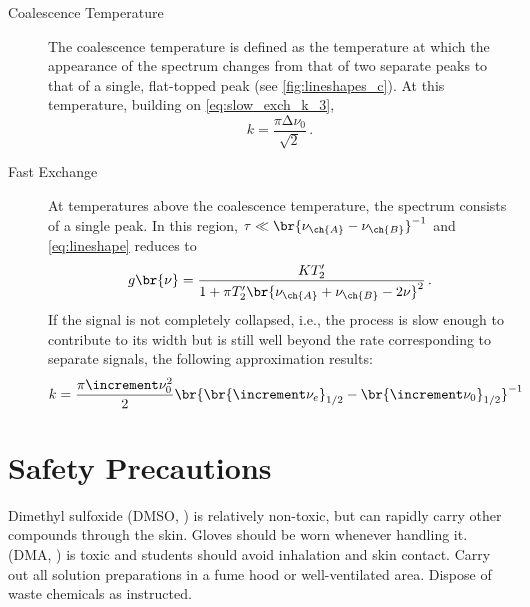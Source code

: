 \begin{description}
	\item[Coalescence Temperature]

	The coalescence temperature is defined as the temperature at which the appearance of the spectrum changes from that of two separate peaks to that of a single, flat-topped peak (see \cref{fig:lineshapes_c}). 
At this temperature, building on \cref{eq:slow_exch_k_3}, 
	\begin{equation}
  	k = \frac{\pi \increment \nu_0}{\sqrt{2}} \, .
  	\label{eq:intermed_exch_k}
	\end{equation}

	\item[Fast Exchange]

	At temperatures above the coalescence temperature, the spectrum consists of a single peak. 
	In this region, \( \tau \ll \br{\nu_{\ch{A}} - \nu_{\ch{B}}}^{-1} \) and \cref{eq:lineshape} reduces to
	\begin{equation}
		g\br{\nu} = \frac{K T'_2}{1 + \pi T'_2 \br{\nu_{\ch{A}} + \nu_{\ch{B}} - 2 \nu}^2} \, .
		\label{eq:fast_exch_lineshape}
	\end{equation}
	If the signal is not completely collapsed, i.e., the process is slow enough to contribute to its width but is still well beyond the rate corresponding to separate signals, the following approximation results:
	\begin{equation}
		k = \frac{\pi \increment \nu_0^2}{2} \br{\br{\increment \nu_e}_{1/2} - \br{\increment \nu_0}_{1/2}}^{-1}
		\label{eq:fast_exch_k}
	\end{equation}

\end{description}


\pagebreak

\section{Safety Precautions} %
\label{sec:safety}

Dimethyl sulfoxide (DMSO, ) is relatively non-toxic, but can rapidly carry other compounds through the skin. 
Gloves should be worn whenever handling it. 
 (DMA, ) is toxic and students should avoid inhalation and skin contact. 
Carry out all solution preparations in a fume hood or well-ventilated area. 
Dispose of waste chemicals as instructed. 


